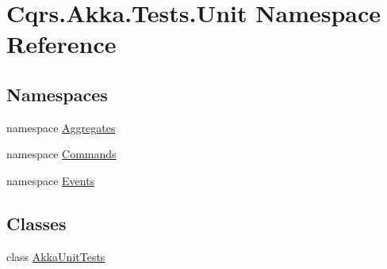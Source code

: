 \hypertarget{namespaceCqrs_1_1Akka_1_1Tests_1_1Unit}{}\section{Cqrs.\+Akka.\+Tests.\+Unit Namespace Reference}
\label{namespaceCqrs_1_1Akka_1_1Tests_1_1Unit}
\subsection*{Namespaces}
\begin{DoxyCompactItemize}
\item 
namespace \hyperlink{namespaceCqrs_1_1Akka_1_1Tests_1_1Unit_1_1Aggregates}{Aggregates}
\item 
namespace \hyperlink{namespaceCqrs_1_1Akka_1_1Tests_1_1Unit_1_1Commands}{Commands}
\item 
namespace \hyperlink{namespaceCqrs_1_1Akka_1_1Tests_1_1Unit_1_1Events}{Events}
\end{DoxyCompactItemize}
\subsection*{Classes}
\begin{DoxyCompactItemize}
\item 
class \hyperlink{classCqrs_1_1Akka_1_1Tests_1_1Unit_1_1AkkaUnitTests}{Akka\+Unit\+Tests}
\end{DoxyCompactItemize}

